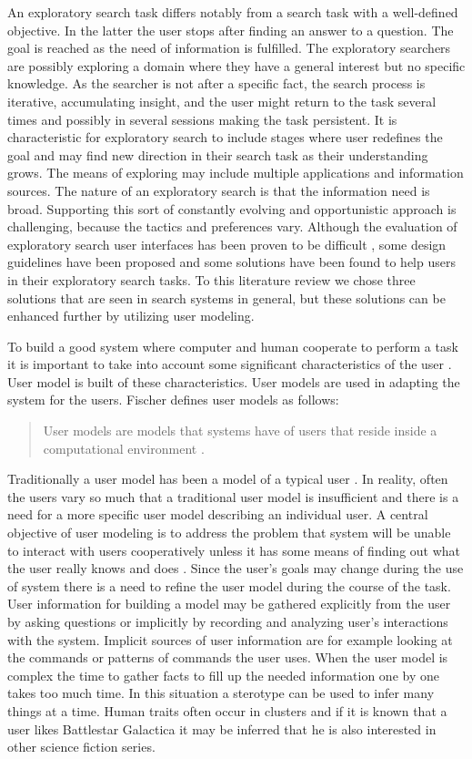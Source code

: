 \documentclass{sigchi}
\begin{document}
An exploratory search task differs notably from a search task with a well-defined objective.
In the latter the user stops after finding an answer to a question.
The goal is reached as the need of information is fulfilled.
The exploratory searchers are possibly exploring a domain where they have a general interest but no specific knowledge.
As the searcher is not after a specific fact, the search process is iterative, accumulating insight, and the user might return to the task several times and possibly in several sessions making the task persistent.
It is characteristic for exploratory search to include stages where user redefines the goal and may find new direction in their search task as their understanding grows.
The means of exploring may include multiple applications and information sources.
The nature of an exploratory search is that the information need is broad.
Supporting this sort of constantly evolving and opportunistic approach is challenging, because the tactics and preferences vary.
Although the evaluation of exploratory search user interfaces has been proven to be difficult \cite{white09}, some design guidelines have been proposed and some solutions have been found to help users in their exploratory search tasks.
To this literature review we chose three solutions that are seen in search systems in general, but these solutions can be enhanced further by utilizing user modeling.

To build a good system where computer and human cooperate to perform a task it is important to take into account some significant characteristics of the user \cite{rich99}.
User model is built of these characteristics.
User models are used in adapting the system for the users.
Fischer defines user models as follows:

\blockquote{User models are models that systems have of users that reside inside a computational environment \cite{fischer01}. }

Traditionally a user model has been a model of a typical user \cite{rich99}.
In reality, often the users vary so much that a traditional user model is insufficient and there is a need for a more specific user model describing an individual user.
A central objective of user modeling is to address the problem that system will be unable to interact with users cooperatively unless it has some means of finding out what the user really knows and does \cite{fischer01}.
Since the user's goals may change during the use of system there is a need to refine the user model during the course of the task.
User information for building a model may be gathered explicitly from the user by asking questions or implicitly by recording and analyzing user's interactions with the system.
Implicit sources of user information are for example looking at the commands or patterns of commands the user uses.
When the user model is complex the time to gather facts to fill up the needed information one by one takes too much time.
In this situation a sterotype can be used to infer many things at a time.
Human traits often occur in clusters and if it is known that a user likes Battlestar Galactica it may be inferred that he is also interested in other science fiction series. 
\end{document}
